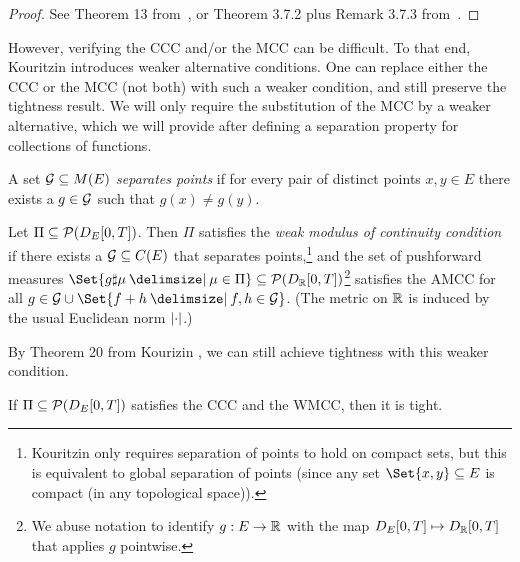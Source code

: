 \begin{proof}
  See Theorem 13 from~\cite{kouritzinTightnessProbabilityMeasures2015}, or Theorem 3.7.2 plus Remark 3.7.3 from~\cite{ethierMarkovProcessesCharacterization1985}.
\end{proof}

However, verifying the CCC and/or the MCC can be difficult.
To that end, Kouritzin introduces weaker alternative conditions.
One can replace either the CCC or the MCC (not both) with such a weaker condition, and still preserve the tightness result.
We will only require the substitution of the MCC by a weaker alternative, which we will provide after defining a separation property for collections of functions.

\begin{definition}\label{def:s.p.}
  A set \( \mathcal{G} \subseteq M(E) \) \textit{separates points} if for every pair of distinct points \( x, y \in E \) there exists a \( g \in \mathcal{G} \) such that \( g(x) \neq g(y) \).
\end{definition}

\begin{definition}[WMCC]\label{def:WMCC}
  Let \( \Pi \subseteq \mathcal{P}(D_{E}[0,T]) \).
  Then \( \Pi \) satisfies the \textit{weak modulus of continuity condition} if there exists a \( \mathcal{G} \subseteq C(E) \) that separates points,\footnote{Kouritzin only requires separation of points to hold on compact sets, but this is equivalent to global separation of points (since any set \( \Set{x,y} \subseteq E \) is compact (in any topological space)).}
  and the set of pushforward measures \( \Set{g \sharp \mu \given \mu \in \Pi} \subseteq \cP(D_\bR[0,T]) \)\footnote{We abuse notation to identify \( g : E \to \mathbb{R} \) with the map \( D_E[0,T] \mapsto D_{\mathbb{R}}[0,T] \) that applies \( g \) pointwise.} satisfies the AMCC for all \( g \in \cG \cup \Set{f + h \given f, h \in \cG} \).
  (The metric on \( \mathbb{R} \) is induced by the usual Euclidean norm \( \lvert\cdot\rvert \).)
\end{definition}

By Theorem 20 from Kourizin \cite{kouritzinTightnessProbabilityMeasures2015}, we can still achieve tightness with this weaker condition.

\begin{theorem}\label{thm:ccc+wmcc=tight}
  If \( \Pi \subseteq \mathcal{P}(D_{E}[0,T]) \) satisfies the CCC and the WMCC, then it is tight.
\end{theorem}

